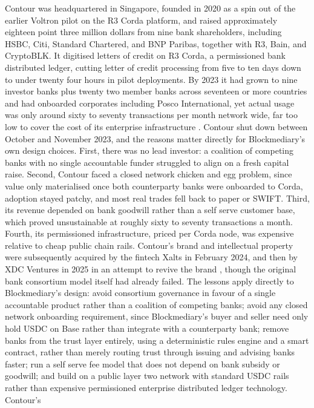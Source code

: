 \documentclass[12pt, a4paper]{article}
\begin{document}
Contour was headquartered in Singapore, founded in 2020 as a spin out of the earlier
Voltron pilot on the R3 Corda platform, and raised approximately eighteen point three
million dollars from nine bank shareholders, including HSBC, Citi, Standard Chartered, and
BNP Paribas, together with R3, Bain, and CryptoBLK. It digitised letters of credit on R3
Corda, a permissioned bank distributed ledger, cutting letter of credit processing from
five to ten days down to under twenty four hours in pilot deployments. By 2023 it had
grown to nine investor banks plus twenty two member banks across seventeen or more
countries and had onboarded corporates including Posco International, yet actual usage was
only around sixty to seventy transactions per month network wide, far too low to cover the
cost of its enterprise infrastructure \citep{contourshutdown2023}. Contour shut down
between October and November 2023, and the reasons matter directly for Blockmediary's own
design choices. First, there was no lead investor: a coalition of competing banks with no
single accountable funder struggled to align on a fresh capital raise. Second, Contour
faced a closed network chicken and egg problem, since value only materialised once both
counterparty banks were onboarded to Corda, adoption stayed patchy, and most real trades
fell back to paper or SWIFT. Third, its revenue depended on bank goodwill rather than a
self serve customer base, which proved unsustainable at roughly sixty to seventy
transactions a month. Fourth, its permissioned infrastructure, priced per Corda node, was
expensive relative to cheap public chain rails. Contour's brand and intellectual property
were subsequently acquired by the fintech Xalts in February 2024, and then by XDC Ventures
in 2025 in an attempt to revive the brand \citep{contourxalts2024}, though the original
bank consortium model itself had already failed. The lessons apply directly to
Blockmediary's design: avoid consortium governance in favour of a single accountable
product rather than a coalition of competing banks; avoid any closed network onboarding
requirement, since Blockmediary's buyer and seller need only hold USDC on Base rather than
integrate with a counterparty bank; remove banks from the trust layer entirely, using a
deterministic rules engine and a smart contract, rather than merely routing trust through
issuing and advising banks faster; run a self serve fee model that does not depend on bank
subsidy or goodwill; and build on a public layer two network with standard USDC rails
rather than expensive permissioned enterprise distributed ledger technology. Contour's
\end{document}
